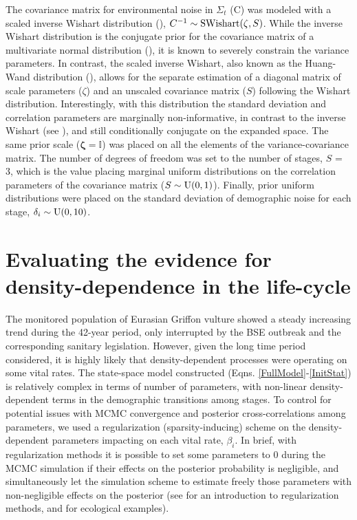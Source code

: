 \documentclass[12pt,a4paper]{article}
\newcommand{\I}{\mathbb{I}}
\begin{document}
The covariance matrix for environmental noise in $\Sigma_{t}$ (C) was modeled with a scaled inverse Wishart distribution (\cite{Huang2013}), $C^{-1} \sim \textnormal{SWishart}(\zeta, S)$. While the  inverse Wishart distribution is the conjugate prior for the covariance matrix of a multivariate normal distribution (\cite{Gelman2014}), it is known to severely constrain the variance parameters. In contrast, the scaled inverse Wishart, also known as the Huang-Wand distribution (\cite{Huang2013}), allows for the separate estimation of a diagonal matrix of scale parameters ($\zeta$) and an unscaled covariance matrix ($S$) following the Wishart distribution. Interestingly, with this distribution the standard deviation and correlation parameters are marginally non-informative, in contrast to the inverse Wishart (see \cite{Huang2013}), and still conditionally conjugate on the expanded space. The same prior scale ($\boldsymbol{\zeta} = \I$) was placed on all the elements of the variance-covariance matrix. The number of degrees of freedom was set to the number of stages, $S$ = 3, which is the value placing marginal uniform distributions on the correlation parameters of the covariance matrix ($S \sim \textnormal{U}(0,1)$). Finally, prior uniform distributions were placed on the standard deviation of demographic noise for each stage, $\delta_{i} \sim \textnormal{U}(0,10)$. \\

\section{Evaluating the evidence for density-dependence in the life-cycle}

The monitored population of Eurasian Griffon vulture showed a steady increasing trend during the 42-year period, only interrupted by the BSE outbreak and the corresponding sanitary legislation. However, given the long time period considered, it is highly likely that density-dependent processes were operating on some vital rates. The state-space model constructed (Eqns. \ref{FullModel}-\ref{InitStat}) is relatively complex in terms of number of parameters, with non-linear density-dependent terms in the demographic transitions among stages. To control for potential issues with MCMC convergence and posterior cross-correlations among parameters, we used a regularization (sparsity-inducing) scheme on the density-dependent parameters impacting on each vital rate, $\beta_{i}$. In brief, with regularization methods it is possible to set some parameters to 0 during the MCMC simulation if their effects on the posterior probability is negligible, and simultaneously let the simulation scheme to estimate freely those parameters with non-negligible effects on the posterior (see \cite{OHara2009} for an introduction to regularization methods, and \cite{Almaraz2011,Mutshinda2011} for ecological examples). \\
\end{document}

